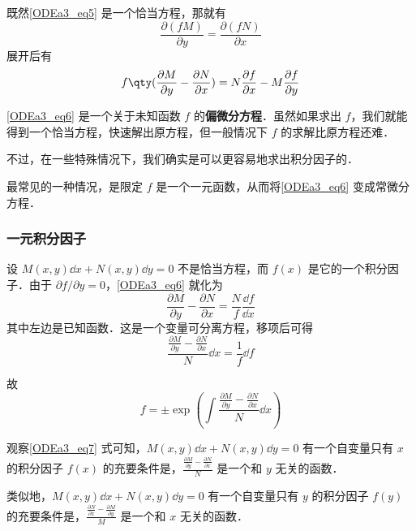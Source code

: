 既然\autoref{ODEa3_eq5} 是一个恰当方程，那就有
\begin{equation}
\frac{\partial (fM)}{\partial y}=\frac{\partial (fN)}{\partial x}
\end{equation}
展开后有
\begin{equation}\label{ODEa3_eq6}
f\qty(\frac{\partial M}{\partial y}-\frac{\partial N}{\partial x})=N\frac{\partial f}{\partial x}-M\frac{\partial f}{\partial y}
\end{equation}

\autoref{ODEa3_eq6} 是一个关于未知函数 $f$ 的\textbf{偏微分方程}．虽然如果求出 $f$，我们就能得到一个恰当方程，快速解出原方程，但一般情况下 $f$ 的求解比原方程还难．

不过，在一些特殊情况下，我们确实是可以更容易地求出积分因子的．

最常见的一种情况，是限定 $f$ 是一个一元函数，从而将\autoref{ODEa3_eq6} 变成常微分方程．

\subsubsection{一元积分因子}

设 $M(x, y)\dd x+N(x, y)\dd y=0$ 不是恰当方程，而 $f(x)$ 是它的一个积分因子．由于 $\partial f/\partial y=0$，\autoref{ODEa3_eq6} 就化为
\begin{equation}
\frac{\partial M}{\partial y}-\frac{\partial N}{\partial x}=\frac{N}{f}\frac{\dd f}{\dd x}
\end{equation}
其中左边是已知函数．这是一个变量可分离方程，移项后可得
\begin{equation}
\frac{\frac{\partial M}{\partial y}-\frac{\partial N}{\partial x}}{N}\dd x=\frac{1}{f}\dd f
\end{equation}

故
\begin{equation}\label{ODEa3_eq7}
f=\pm \exp(\int \frac{\frac{\partial M}{\partial y}-\frac{\partial N}{\partial x}}{N}\dd x)
\end{equation}

观察\autoref{ODEa3_eq7} 式可知，$M(x, y)\dd x+N(x, y)\dd y=0$ 有一个自变量只有 $x$ 的积分因子 $f(x)$ 的充要条件是，$\frac{\frac{\partial M}{\partial y}-\frac{\partial N}{\partial x}}{N}$ 是一个和 $y$ 无关的函数．

类似地，$M(x, y)\dd x+N(x, y)\dd y=0$ 有一个自变量只有 $y$ 的积分因子 $f(y)$ 的充要条件是，$\frac{\frac{\partial N}{\partial x}-\frac{\partial M}{\partial y}}{M}$ 是一个和 $x$ 无关的函数．

